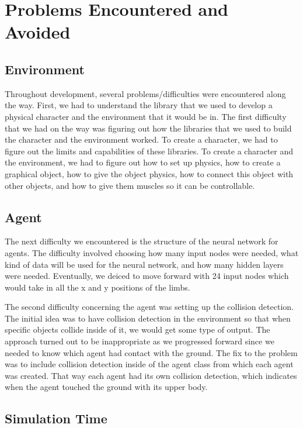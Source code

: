 \documentclass[letterpaper]{article} %
\begin{document}
\section{Problems Encountered and Avoided}

\subsection{Environment}
Throughout development, several problems/difficulties were encountered along the way. First, we had to understand the library that we used to develop a physical character and the environment that it would be in. The first difficulty that we had on the way was figuring out how the libraries that we used to build the character and the environment worked. To create a character, we had to figure out the limits and capabilities of these libraries. To create a character and the environment, we had to figure out how to set up physics, how to create a graphical object, how to give the object physics, how to connect this object with other objects, and how to give them muscles so it can be controllable. 

\subsection{Agent}

The next difficulty we encountered is the structure of the neural network for agents. The difficulty involved choosing how many input nodes were needed, what kind of data will be used for the neural network, and how many hidden layers were needed. Eventually, we deiced to move forward with 24 input nodes which would take in all the x and y positions of the limbs. 

\par The second difficulty concerning the agent was setting up the collision detection. The initial idea was to have collision detection in the environment so that when specific objects collide inside of it, we would get some type of output. The approach turned out to be inappropriate as we progressed forward since we needed to know which agent had contact with the ground. The fix to the problem was to include collision detection inside of the agent class from which each agent was created. That way each agent had its own collision detection, which indicates when the agent touched the ground with its upper body.

\subsection{Simulation Time}
\end{document}
